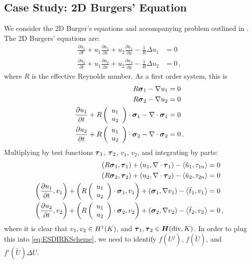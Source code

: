 \documentclass[Proposal.tex]{subfiles}
\begin{document}
\subsection{Case Study: 2D Burgers' Equation}
We consider the 2D Burger's equations and accompanying problem outlined in \cite{Burgers2D}.
The 2D Burgers' equations are:
\begin{equation}
	\begin{aligned}
		\frac{\partial u_1}{\partial t}+u_1\frac{\partial u_1}{\partial x}+u_2\frac{\partial u_1}{\partial y}-\frac{1}{R}\Delta u_1&=0\\
		\frac{\partial u_2}{\partial t}+u_1\frac{\partial u_2}{\partial x}+u_2\frac{\partial u_2}{\partial y}-\frac{1}{R}\Delta u_2&=0\,,
	\end{aligned}
\end{equation}
where $R$ is the effective Reynolds number.
As a first order system, this is
\begin{equation}
	\begin{aligned}
		R\boldsymbol\sigma_1-\nabla u_1&=0\\
		R\boldsymbol\sigma_2-\nabla u_2&=0\\
		\frac{\partial u_1}{\partial t}+R\left( \begin{array}{c} u_1\\ u_2\\ \end{array} \right)\cdot\boldsymbol\sigma_1-\nabla\cdot\boldsymbol\sigma_1&=0\\
		\frac{\partial u_2}{\partial t}+R\left( \begin{array}{c} u_1\\ u_2\\ \end{array} \right)\cdot\boldsymbol\sigma_2-\nabla\cdot\boldsymbol\sigma_2&=0\,.
	\end{aligned}
\end{equation}
Multiplying by test functions $\boldsymbol\tau_1$, $\boldsymbol\tau_2$, $v_1$, $v_2$, and integrating by parts:
\begin{equation}
\label{eq:Burgers2DBF}
	\begin{aligned}
		\left( R\boldsymbol\sigma_1,\boldsymbol\tau_1 \right)+\left( u_1,\nabla\cdot\boldsymbol\tau_1 \right)-\left\langle \hat u_1,\tau_{1n} \right\rangle&=0\\
		\left( R\boldsymbol\sigma_2,\boldsymbol\tau_2 \right)+\left( u_2,\nabla\cdot\boldsymbol\tau_2 \right)-\left\langle \hat u_2,\tau_{2n} \right\rangle&=0\\
		\left( \frac{\partial u_1}{\partial t},v_1 \right)+\left( R\left( \begin{array}{c} u_1\\ u_2\\ \end{array} \right)\cdot\boldsymbol\sigma_1,v_1 \right)+\left( \boldsymbol\sigma_1,\nabla v_1 \right)-\left\langle \hat t_1,v_1 \right\rangle&=0\\
		\left( \frac{\partial u_2}{\partial t},v_2 \right)+\left( R\left( \begin{array}{c} u_1\\ u_2\\ \end{array} \right)\cdot\boldsymbol\sigma_2,v_2 \right)+\left( \boldsymbol\sigma_2,\nabla v_2 \right)-\left\langle \hat t_2,v_2 \right\rangle&=0\,,
	\end{aligned}
\end{equation}
where it is clear that $v_1,v_2\in H^{1}(K)$, and $\boldsymbol\tau_1,\boldsymbol\tau_2\in\mbox{\boldmath $H$}(\text{div},K)$. 
In order to plug this into \eqref{eq:ESDIRKScheme}, we need to identify $f(U^j)$, $f(\tilde U)$, and $f'(\tilde U)\Delta U$.
\end{document}
